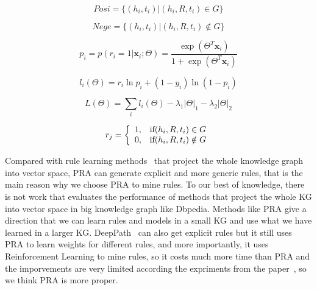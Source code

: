 \documentclass[runningheads]{llncs}
\begin{document}
\begin{equation}\label{posi}
    Posi = \{(h_i,t_i)|(h_i,R,t_i) \in G\}
\end{equation}

\begin{equation}\label{nege}
    Nege = \{(h_i,t_i)|(h_i,R,t_i) \notin G\}
\end{equation}

\begin{equation}
  p_i = p(r_i = 1|\mathbf x_i; \Theta) = \frac{\exp(\Theta^T \mathbf x_i) } { 1 + \exp (\Theta^T \mathbf x_i)}
\end{equation}

\begin{equation}
    l_{i} (\Theta) = r_{i}\ln p_{i} + (1 - y_{i}) \ln ( 1 - p_{i})
\end{equation}

\begin{equation}\label{loss}
    L(\Theta) = \sum_{i} l_{i} (\Theta) - \lambda_{1}|\Theta|_{1}-\lambda_{2}|\Theta|_{2}
\end{equation}

\begin{equation}\label{rj}
r_{j} =
\left\{
\begin{array}{ l l }
  1, & { \text{if} (h_i,R,t_i) \in G } \\
  0, & { \text{if} (h_i,R,t_i) \notin G }
\end{array}
\right.
\end{equation}

Compared with rule learning methods~\cite{yang2017differentiable,das2017go} that project the whole knowledge graph into vector space, PRA can generate explicit and more generic rules, that is the main reason why we choose PRA to mine rules. To our best of knowledge, there is not work that evaluates the performance of methods that project the whole KG into vector space in big knowledge graph like Dbpedia. Methods like PRA give a direction that we can learn rules and models in a small KG and use what we have learned in a larger KG. DeepPath~\cite{xiong2017deeppath} can also get explicit rules but it still uses PRA to learn weights for different rules, and more importantly, it uses Reinforcement Learning to mine rules, so it costs much more time than PRA and the imporvements are very limited according the expriments from the paper~\cite{xiong2017deeppath}, so we think PRA is more proper.
\end{document}

